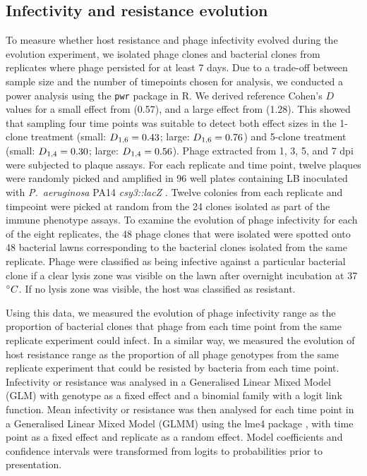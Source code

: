 \documentclass [12pt, a4paper, twoside]  {article}
\newcommand{\sub}{\textsubscript}
\begin{document}
\subsection*{Infectivity and resistance evolution}
To measure whether host resistance and phage infectivity evolved during the evolution experiment, we isolated phage clones and bacterial clones from replicates where phage persisted for at least 7 days. Due to a trade-off between sample size and the number of timepoints chosen for analysis, we conducted a power analysis using the \texttt{pwr} package \citep{pwr} in R. We derived reference Cohen's $D$ values for a small effect from \cite{common2018PhilTrans} (0.57), and a large effect from \cite{hall2011coevophage} (1.28). This showed that sampling four time points was suitable to detect both effect sizes in the 1-clone treatment (small: $D\sub{1,6}=0.43$; large: $D\sub{1,6}=0.76$)  and 5-clone treatment (small: $D\sub{1,4}=0.30$; large: $D\sub{1,4}=0.56$). Phage extracted from 1, 3, 5, and 7 dpi were subjected to plaque assays. For each replicate and time point, twelve plaques were randomly picked and amplified in 96 well plates containing LB inoculated with \textit{P.~aeruginosa} PA14 \textit{csy3::lacZ }. Twelve colonies from each replicate and timpeoint were picked at random from the 24 clones isolated as part of the immune phenotype assays. To examine the evolution of phage infectivity for each of the eight replicates, the 48 phage clones that were isolated were spotted onto 48 bacterial lawns corresponding to the bacterial clones isolated from the same replicate. Phage were classified as being infective against a particular bacterial clone if a clear lysis zone was visible on the lawn after overnight incubation at 37$\degree{}C$. If no lysis zone was visible, the host was classified as resistant. 

Using this data, we measured the evolution of phage infectivity range as the proportion of bacterial clones that phage from each time point from the same replicate experiment could infect. In a similar way, we measured the evolution of host resistance range as the proportion of all phage genotypes from the same replicate experiment that could be resisted by bacteria from each time point. Infectivity or resistance was analysed in a Generalised Linear Mixed Model (GLM) with genotype as a fixed effect and a binomial family with a logit link function. Mean infectivity or resistance was then analysed for each time point in a Generalised Linear Mixed Model (GLMM) using the lme4 package \citep{lme4}, with time point as a fixed effect and replicate as a random effect. Model coefficients and confidence intervals were transformed from logits to probabilities prior to presentation.
\end{document}
